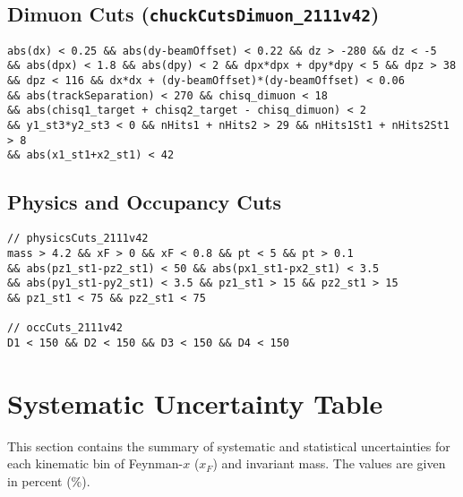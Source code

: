 \documentclass[11pt]{article}
\begin{document}
\begin{appendices}
\subsection{Dimuon Cuts (\texttt{chuckCutsDimuon\_2111v42})}
\label{cut:chuck_dimuon}
{\small\begin{verbatim}
abs(dx) < 0.25 && abs(dy-beamOffset) < 0.22 && dz > -280 && dz < -5
&& abs(dpx) < 1.8 && abs(dpy) < 2 && dpx*dpx + dpy*dpy < 5 && dpz > 38
&& dpz < 116 && dx*dx + (dy-beamOffset)*(dy-beamOffset) < 0.06
&& abs(trackSeparation) < 270 && chisq_dimuon < 18
&& abs(chisq1_target + chisq2_target - chisq_dimuon) < 2
&& y1_st3*y2_st3 < 0 && nHits1 + nHits2 > 29 && nHits1St1 + nHits2St1 > 8
&& abs(x1_st1+x2_st1) < 42
\end{verbatim}}

\subsection{Physics and Occupancy Cuts}
\label{cut:physics_occ}
{\small\begin{verbatim}
// physicsCuts_2111v42
mass > 4.2 && xF > 0 && xF < 0.8 && pt < 5 && pt > 0.1
&& abs(pz1_st1-pz2_st1) < 50 && abs(px1_st1-px2_st1) < 3.5
&& abs(py1_st1-py2_st1) < 3.5 && pz1_st1 > 15 && pz2_st1 > 15
&& pz1_st1 < 75 && pz2_st1 < 75

// occCuts_2111v42
D1 < 150 && D2 < 150 && D3 < 150 && D4 < 150
\end{verbatim}}

\clearpage

\section{Systematic Uncertainty Table}
\label{app:systematics_table}

This section contains the summary of systematic and statistical uncertainties for each kinematic bin of Feynman-$x$ ($x_F$) and invariant mass. The values are given in percent (\%).

\begin{landscape}
    \centering
    \label{tab:systematics_summary}
    \vspace{1em} %
    \tiny %
\end{landscape}

\end{appendices}
\end{document}
